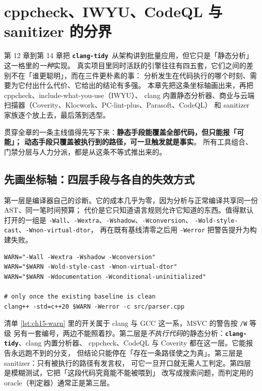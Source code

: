 \documentclass[12pt,a4paper,fontset=fandol]{ctexbook}
\newcommand{\Bk}{\discretionary{}{}{}}
\newcommand{\Lib}[1]{\textbf{\texttt{#1}}}
\newcommand{\Tidy}{\Lib{clang-tidy}}
\begin{document}
\chapter{cppcheck、IWYU、CodeQL 与 sanitizer 的分界}\label{ch:boundaries}

第 12 章到第 14 章把 \Tidy\ 从架构讲到批量应用，但它只是「静态分析」这一格里的\emph{一种}实现。
真实项目里同时活跃的引擎往往有四五套，它们之间的差别不在「谁更聪明」，而在三件更朴素的事：
分析发生在代码执行的哪个时刻、需要为它付出什么代价、它给出的结论有多强。
本章先把这条坐标轴画出来，再把 \Bk cppcheck\Bk、include-what-you-use（IWYU）、
clang 内置静态分析器、商业与云端扫描器（Coverity、Klocwork、PC-lint-plus、Parasoft、CodeQL）
和 sanitizer 家族逐个放上去，最后落到选型。

贯穿全章的一条主线值得先写下来：\textbf{静态手段能覆盖全部代码，但只能报「可能」；
动态手段只覆盖被执行到的路径，可一旦触发就是事实}。
所有工具组合、门禁分层与人力分派，都是从这条不等式推出来的。

\section{先画坐标轴：四层手段与各自的失效方式}\label{sec:ch15-s1}

第一层是编译器自己的诊断。它的成本几乎为零，因为分析与正常编译共享同一份 AST、同一笔时间预算；
代价是它只知道语言规则允许它知道的东西。值得默认打开的一组是
\texttt{-Wall}、\texttt{-Wextra}、\texttt{-Wshadow}、\texttt{-Wconversion}、
\texttt{-Wold-style-cast}、\texttt{-Wnon-virtual-dtor}，
再在既有基线清零之后用 \texttt{-Werror} 把警告提升为构建失败。

\begin{lstlisting}[style=shellstyle,caption={编译期诊断层：最小可用的一套警告},label={lst:ch15-warn}]
WARN="-Wall -Wextra -Wshadow -Wconversion"
WARN="$WARN -Wold-style-cast -Wnon-virtual-dtor"
WARN="$WARN -Wdocumentation -Wconditional-uninitialized"

# only once the existing baseline is clean
clang++ -std=c++20 $WARN -Werror -c src/parser.cpp
\end{lstlisting}

清单 \ref{lst:ch15-warn} 里的开关属于 clang 与 GCC 这一系，MSVC 的警告按 \texttt{/W} 等级
另有一套编号，两边不能照着抄。第二层是\emph{不执行代码}的静态分析：\Tidy、clang 内置分析器、
\Bk cppcheck\Bk、CodeQL 与 Coverity 都在这一层。它能报告永远跑不到的分支，
但结论只能停在「存在一条路径使之为真」。第三层是 sanitizer：只有被执行的路径有发言权，
可它一旦开口就无需人工判定。第四层是模糊测试，它把「这段代码究竟能不能被喂到」
改写成搜索问题，而判定用的 oracle（判定器）通常正是第三层。
\end{document}
